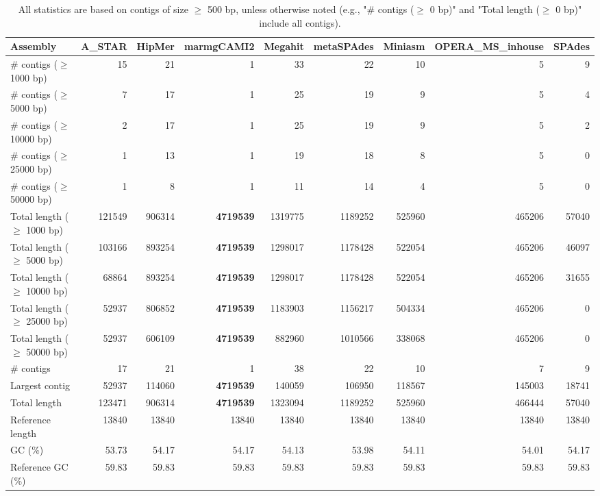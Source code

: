 \documentclass[12pt,a4paper]{article}
\begin{document}
\begin{table}[ht]
\begin{center}
\caption{All statistics are based on contigs of size $\geq$ 500 bp, unless otherwise noted (e.g., "\# contigs ($\geq$ 0 bp)" and "Total length ($\geq$ 0 bp)" include all contigs).}
\begin{tabular}{|l*{8}{|r}|}
\hline
Assembly & A\_STAR & HipMer & marmgCAMI2 & Megahit & metaSPAdes & Miniasm & OPERA\_MS\_inhouse & SPAdes \\ \hline
\# contigs ($\geq$ 1000 bp) & 15 & 21 & 1 & 33 & 22 & 10 & 5 & 9 \\ \hline
\# contigs ($\geq$ 5000 bp) & 7 & 17 & 1 & 25 & 19 & 9 & 5 & 4 \\ \hline
\# contigs ($\geq$ 10000 bp) & 2 & 17 & 1 & 25 & 19 & 9 & 5 & 2 \\ \hline
\# contigs ($\geq$ 25000 bp) & 1 & 13 & 1 & 19 & 18 & 8 & 5 & 0 \\ \hline
\# contigs ($\geq$ 50000 bp) & 1 & 8 & 1 & 11 & 14 & 4 & 5 & 0 \\ \hline
Total length ($\geq$ 1000 bp) & 121549 & 906314 & {\bf 4719539} & 1319775 & 1189252 & 525960 & 465206 & 57040 \\ \hline
Total length ($\geq$ 5000 bp) & 103166 & 893254 & {\bf 4719539} & 1298017 & 1178428 & 522054 & 465206 & 46097 \\ \hline
Total length ($\geq$ 10000 bp) & 68864 & 893254 & {\bf 4719539} & 1298017 & 1178428 & 522054 & 465206 & 31655 \\ \hline
Total length ($\geq$ 25000 bp) & 52937 & 806852 & {\bf 4719539} & 1183903 & 1156217 & 504334 & 465206 & 0 \\ \hline
Total length ($\geq$ 50000 bp) & 52937 & 606109 & {\bf 4719539} & 882960 & 1010566 & 338068 & 465206 & 0 \\ \hline
\# contigs & 17 & 21 & 1 & 38 & 22 & 10 & 7 & 9 \\ \hline
Largest contig & 52937 & 114060 & {\bf 4719539} & 140059 & 106950 & 118567 & 145003 & 18741 \\ \hline
Total length & 123471 & 906314 & {\bf 4719539} & 1323094 & 1189252 & 525960 & 466444 & 57040 \\ \hline
Reference length & 13840 & 13840 & 13840 & 13840 & 13840 & 13840 & 13840 & 13840 \\ \hline
GC (\%) & 53.73 & 54.17 & 54.17 & 54.13 & 53.98 & 54.11 & 54.01 & 54.17 \\ \hline
Reference GC (\%) & 59.83 & 59.83 & 59.83 & 59.83 & 59.83 & 59.83 & 59.83 & 59.83 \\ \hline

\end{tabular}
\end{center}
\end{table}
\end{document}
